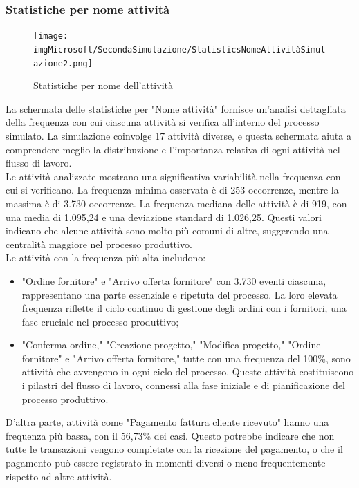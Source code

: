 \documentclass{article}
\begin{document}
\subsubsection{Statistiche per nome attività}
\begin{figure}[H]
    \centering
    \texttt{[image: imgMicrosoft/SecondaSimulazione/StatisticsNomeAttivitàSimulazione2.png]}
    \caption{Statistiche per nome dell'attività}
    \label{fig:statistics-nome-attività}
\end{figure}
La schermata delle statistiche per "Nome attività" fornisce un'analisi dettagliata della frequenza con cui ciascuna attività si verifica all'interno del processo simulato. La simulazione coinvolge 17 attività diverse, e questa schermata aiuta a comprendere meglio la distribuzione e l'importanza relativa di ogni attività nel flusso di lavoro.\\
Le attività analizzate mostrano una significativa variabilità nella frequenza con cui si verificano. La frequenza minima osservata è di 253 occorrenze, mentre la massima è di 3.730 occorrenze. La frequenza mediana delle attività è di 919, con una media di 1.095,24 e una deviazione standard di 1.026,25. Questi valori indicano che alcune attività sono molto più comuni di altre, suggerendo una centralità maggiore nel processo produttivo.\\
Le attività con la frequenza più alta includono:
\begin{itemize}
    \item "Ordine fornitore" e "Arrivo offerta fornitore" con 3.730 eventi ciascuna, rappresentano una parte essenziale e ripetuta del processo. La loro elevata frequenza riflette il ciclo continuo di gestione degli ordini con i fornitori, una fase cruciale nel processo produttivo;
    \item "Conferma ordine," "Creazione progetto," "Modifica progetto," "Ordine fornitore" e "Arrivo offerta fornitore," tutte con una frequenza del 100\%, sono attività che avvengono in ogni ciclo del processo. Queste attività costituiscono i pilastri del flusso di lavoro, connessi alla fase iniziale e di pianificazione del processo produttivo.
\end{itemize}
D'altra parte, attività come "Pagamento fattura cliente ricevuto" hanno una frequenza più bassa, con il 56,73\% dei casi. Questo potrebbe indicare che non tutte le transazioni vengono completate con la ricezione del pagamento, o che il pagamento può essere registrato in momenti diversi o meno frequentemente rispetto ad altre attività.\\
\end{document}
